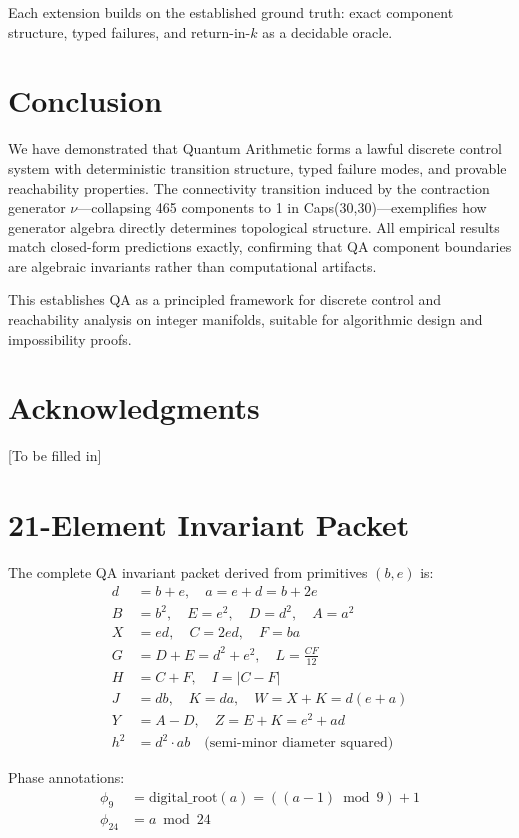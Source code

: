 \documentclass[11pt]{article}
\theoremstyle{definition}
\begin{document}
Each extension builds on the established ground truth: exact component structure, typed failures, and return-in-$k$ as a decidable oracle.

\section{Conclusion}

We have demonstrated that Quantum Arithmetic forms a lawful discrete control system with deterministic transition structure, typed failure modes, and provable reachability properties. The connectivity transition induced by the contraction generator $\nu$—collapsing 465 components to 1 in Caps(30,30)—exemplifies how generator algebra directly determines topological structure. All empirical results match closed-form predictions exactly, confirming that QA component boundaries are algebraic invariants rather than computational artifacts.

This establishes QA as a principled framework for discrete control and reachability analysis on integer manifolds, suitable for algorithmic design and impossibility proofs.

\section*{Acknowledgments}

[To be filled in]




\appendix

\section{21-Element Invariant Packet}

The complete QA invariant packet derived from primitives $(b,e)$ is:
\begin{align*}
d &= b+e, \quad a = e+d = b+2e \\
B &= b^2, \quad E = e^2, \quad D = d^2, \quad A = a^2 \\
X &= ed, \quad C = 2ed, \quad F = ba \\
G &= D + E = d^2 + e^2, \quad L = \frac{CF}{12} \\
H &= C + F, \quad I = |C - F| \\
J &= db, \quad K = da, \quad W = X + K = d(e+a) \\
Y &= A - D, \quad Z = E + K = e^2 + ad \\
h^2 &= d^2 \cdot ab \quad \text{(semi-minor diameter squared)}
\end{align*}

Phase annotations:
\begin{align*}
\phi_9 &= \text{digital\_root}(a) = ((a-1) \bmod 9) + 1 \\
\phi_{24} &= a \bmod 24
\end{align*}
\end{document}
